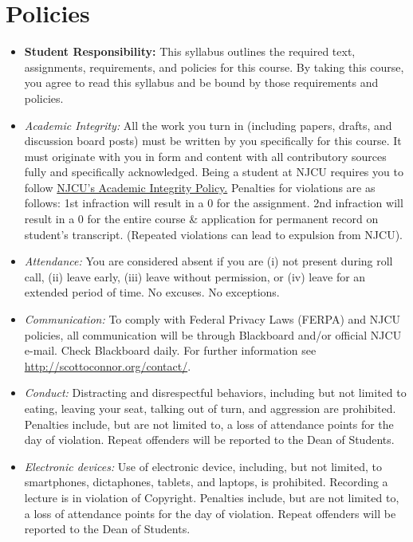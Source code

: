 \documentclass[article,oneside]{memoir}
\begin{document}
\section{Policies}

\begin{itemize}

\item \textbf{Student Responsibility:} This syllabus outlines the required text, assignments, requirements, and policies for this course. By taking this course, you agree to read this syllabus and be bound by those requirements and policies. 

 \item \textit{Academic Integrity:} All the work you turn in (including papers, drafts, and discussion board posts) must be written by you specifically for this course. It must originate with you in form and content with all contributory sources fully and specifically acknowledged. Being a student at NJCU requires you to follow \href{http://scottoconnor.org/resources/Plagiarism.pdf}{NJCU's Academic Integrity Policy.} Penalties for violations are as follows: 1st infraction will result in a 0 for the assignment.  2nd infraction will result in a 0 for the entire course \& application for permanent record on student's transcript. (Repeated violations can lead to expulsion from NJCU). 


\item \textit{Attendance:} You are considered absent if you are (i) not present during roll call, (ii) leave early, (iii) leave without permission, or (iv) leave for an extended period of time. No excuses. No exceptions.



\item \textit{Communication:} To comply with Federal Privacy Laws (FERPA) and NJCU policies, all communication will be through Blackboard and/or official NJCU e-mail. Check Blackboard daily. For further information see \href{http://scottoconnor.org/contact/}{http://scottoconnor.org/contact/}.

\item \textit{Conduct:} Distracting and disrespectful behaviors, including but not limited to eating, leaving your seat, talking out of turn, and aggression are prohibited. Penalties include, but are not limited to, a loss of attendance points for the day of violation. Repeat offenders will be reported to the Dean of Students. 

\item \textit{Electronic devices:} Use of electronic device, including, but not limited, to smartphones, dictaphones, tablets, and laptops, is prohibited. Recording a lecture is in violation of Copyright. Penalties include, but are not limited to, a loss of attendance points for the day of violation. Repeat offenders will be reported to the Dean of Students.



\end{itemize}
\end{document}
